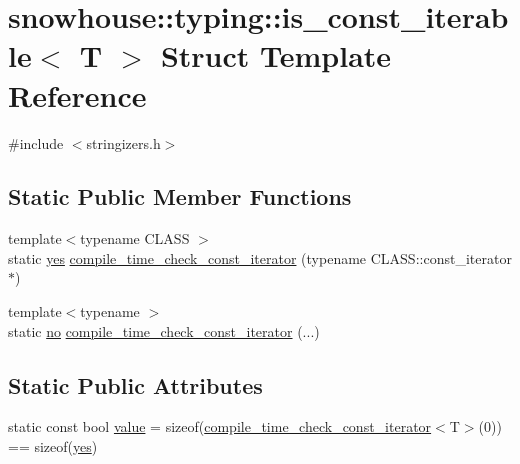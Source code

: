 \hypertarget{structsnowhouse_1_1typing_1_1is__const__iterable}{}\section{snowhouse\+::typing\+::is\+\_\+const\+\_\+iterable$<$ T $>$ Struct Template Reference}
\label{structsnowhouse_1_1typing_1_1is__const__iterable}


{\ttfamily \#include $<$stringizers.\+h$>$}

\subsection*{Static Public Member Functions}
\begin{DoxyCompactItemize}
\item 
{\footnotesize template$<$typename C\+L\+A\+SS $>$ }\\static \mbox{\hyperlink{namespacesnowhouse_1_1typing_a4b319cb7567ee3475023c05ed2dadb16}{yes}} \mbox{\hyperlink{structsnowhouse_1_1typing_1_1is__const__iterable_a08ed1d0c1623931531b729c3a3d863af}{compile\+\_\+time\+\_\+check\+\_\+const\+\_\+iterator}} (typename C\+L\+A\+S\+S\+::const\+\_\+iterator $\ast$)
\item 
{\footnotesize template$<$typename $>$ }\\static \mbox{\hyperlink{namespacesnowhouse_1_1typing_ad9bd8c4cca2c9f7de1faf7a7f53b1bda}{no}} \mbox{\hyperlink{structsnowhouse_1_1typing_1_1is__const__iterable_aeb469ad0d7aa2c71c4da3dece5075399}{compile\+\_\+time\+\_\+check\+\_\+const\+\_\+iterator}} (...)
\end{DoxyCompactItemize}
\subsection*{Static Public Attributes}
\begin{DoxyCompactItemize}
\item 
static const bool \mbox{\hyperlink{structsnowhouse_1_1typing_1_1is__const__iterable_ab68b85b809b6417989816d6b4605c6e6}{value}} = sizeof(\mbox{\hyperlink{structsnowhouse_1_1typing_1_1is__const__iterable_a08ed1d0c1623931531b729c3a3d863af}{compile\+\_\+time\+\_\+check\+\_\+const\+\_\+iterator}}$<$T$>$(0)) == sizeof(\mbox{\hyperlink{namespacesnowhouse_1_1typing_a4b319cb7567ee3475023c05ed2dadb16}{yes}})
\end{DoxyCompactItemize}


